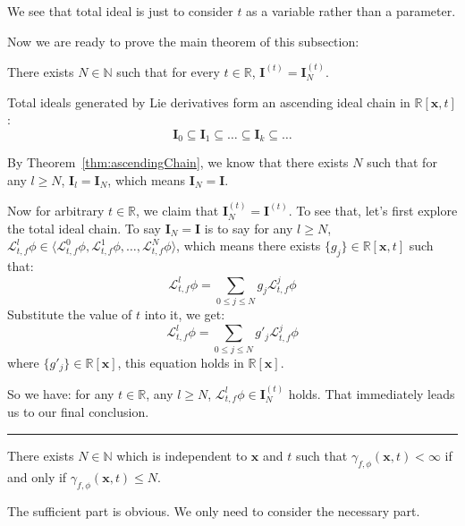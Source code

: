 \documentclass{jssc}
\newcommand{\rulex}{\hfill\rule{1mm}{3mm}}
\begin{document}
We see that total ideal is just to consider $t$ as a variable rather than a parameter.

Now we are ready to prove the main theorem of this subsection:
\begin{theorem}
\label{thm:lieIdeal}
There exists $N \in \mathbb{N}$ such that for every $t \in \mathbb{R}$, $\boldsymbol{I}^{(t)} = \boldsymbol{I}_N^{(t)}$.
\end{theorem}

\proof
Total ideals generated by Lie derivatives form an ascending ideal chain in $\mathbb{R}[\boldsymbol{x}, t]$:
\begin{equation*}
	\boldsymbol{I}_0 \subseteq \boldsymbol{I}_1 \subseteq \dots \subseteq \boldsymbol{I}_{k} \subseteq \dots
\end{equation*}

By Theorem~\ref{thm:ascendingChain}, we know that there exists $N$ such that for any $l \geq N$, $\boldsymbol{I}_l = \boldsymbol{I}_N$, which means $\boldsymbol{I}_N = \boldsymbol{I}$.

Now for arbitrary $t \in \mathbb{R}$, we claim that $\boldsymbol{I}_N^{(t)} = \boldsymbol{I}^{(t)}$. To see that, let's first explore the total ideal chain. To say $\boldsymbol{I}_N = \boldsymbol{I}$ is to say for any $l \geq N$, $\mathcal{L}_{t, f}^l \phi  \in \langle \mathcal{L}_{t, f}^0 \phi, \mathcal{L}_{t, f}^1 \phi, \dots, \mathcal{L}_{t, f}^N \phi \rangle$, which means there exists $\{ g_j \} \in \mathbb{R} [\boldsymbol{x}, t]$ such that:
	\begin{equation*}
		\mathcal{L}_{t, f}^l \phi = \sum_{0 \leq j \leq N} g_j \mathcal{L}_{t, f}^j \phi
	\end{equation*}
Substitute the value of $t$ into it, we get:
	\begin{equation*}
		\mathcal{L}_{t, f}^l \phi = \sum_{0 \leq j \leq N} g'_j \mathcal{L}_{t, f}^j \phi
	\end{equation*}
where $\{ g'_j \} \in \mathbb{R} [\boldsymbol{x}]$, this equation holds in $\mathbb{R} [\boldsymbol{x}]$.

So we have: for any $t \in \mathbb{R}$, any $l \geq N$, $\mathcal{L}_{t, f}^l \phi  \in \boldsymbol{I}_N^{(t)}$ holds. That immediately leads us to our final conclusion.
\rulex \newline

\begin{corollary}
\label{cor:lieRank}
There exists $N \in \mathbb{N}$ which is independent to $\boldsymbol{x}$ and $t$ such that $\gamma_{f, \phi}(\boldsymbol{x}, t) < \infty$ if and only if $\gamma_{f, \phi}(\boldsymbol{x}, t) \leq N$.
\end{corollary}
\proof
The sufficient part is obvious. We only need to consider the necessary part.
\end{document}
